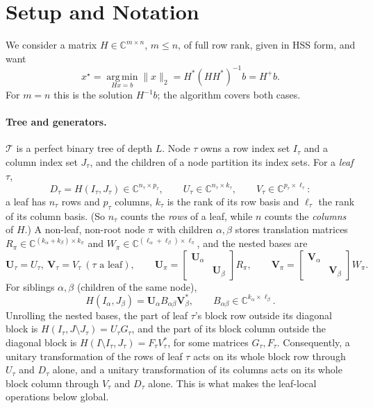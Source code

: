 \section{Setup and Notation}
\label{sec:setup}

We consider a matrix $H\in\mathbb{C}^{m\times n}$, $m\le n$, of full row rank, given in HSS form, and want
\[
x^\star=\operatorname*{arg\,min}_{Hx=b}\|x\|_2 = H^*(HH^*)^{-1}b = H^+ b .
\]
For $m=n$ this is the solution $H^{-1}b$; the algorithm covers both cases.

\paragraph{Tree and generators.}
$\mathcal T$ is a perfect binary tree of depth $L$. Node $\tau$ owns a row index set
$I_\tau$ and a column index set $J_\tau$, and the children of a node partition its index
sets. For a \emph{leaf} $\tau$,
\[
D_\tau = H(I_\tau,J_\tau)\in\mathbb{C}^{n_\tau\times p_\tau},\qquad
U_\tau\in\mathbb{C}^{n_\tau\times k_\tau},\qquad
V_\tau\in\mathbb{C}^{p_\tau\times \ell_\tau}:
\]
a leaf has $n_\tau$ rows and $p_\tau$ columns, $k_\tau$ is the rank of its row basis and $\ell_\tau$
the rank of its column basis. (So $n_\tau$ counts the \emph{rows} of a leaf, while $n$ counts the
\emph{columns} of $H$.) A non-leaf, non-root node $\pi$ with children $\alpha,\beta$ stores translation
matrices $R_\pi\in\mathbb{C}^{(k_\alpha+k_\beta)\times k_\pi}$ and
$W_\pi\in\mathbb{C}^{(\ell_\alpha+\ell_\beta)\times\ell_\pi}$, and the nested bases are
\[
\mathbf U_\tau = U_\tau,\ \mathbf V_\tau=V_\tau\ (\tau\text{ a leaf}),\qquad
\mathbf U_\pi=\begin{bmatrix}\mathbf U_\alpha&\\&\mathbf U_\beta\end{bmatrix}R_\pi,\qquad
\mathbf V_\pi=\begin{bmatrix}\mathbf V_\alpha&\\&\mathbf V_\beta\end{bmatrix}W_\pi .
\]
For siblings $\alpha,\beta$ (children of the same node),
\begin{equation}\label{eq:offdiag}
H(I_\alpha,J_\beta)=\mathbf U_\alpha B_{\alpha\beta}\mathbf V_\beta^*,\qquad B_{\alpha\beta}\in\mathbb{C}^{k_\alpha\times\ell_\beta}.
\end{equation}
Unrolling the nested bases, the part of leaf $\tau$'s block row outside its diagonal block is
$H(I_\tau,J\setminus J_\tau)=U_\tau G_\tau$, and the part of its block column outside the diagonal
block is $H(I\setminus I_\tau,J_\tau)=F_\tau V_\tau^*$, for some matrices $G_\tau,F_\tau$. Consequently,
a unitary transformation of the rows of leaf $\tau$ acts on its whole block row through $U_\tau$
and $D_\tau$ alone, and a unitary transformation of its columns acts on its whole block column
through $V_\tau$ and $D_\tau$ alone. This is what makes the leaf-local operations below global.

